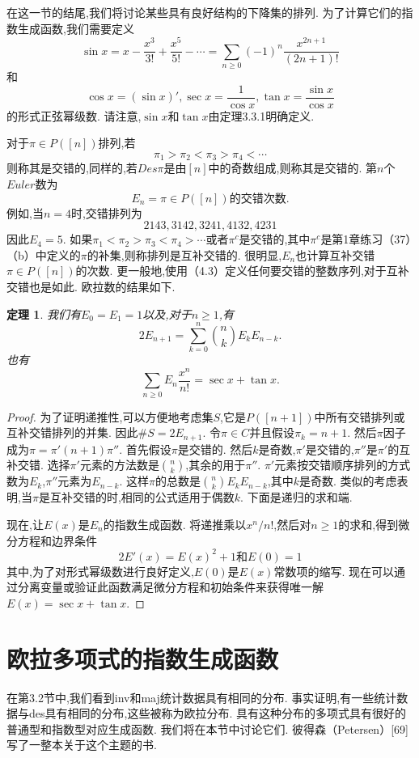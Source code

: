 \documentclass[a4paper,12pt]{ctexbook}
\newtheorem{theorem}[lemma]{\hspace{2em}定理}%
\begin{document}
在这一节的结尾,我们将讨论某些具有良好结构的下降集的排列.  为了计算它们的指数生成函数,我们需要定义
$$
\sin x=x-\frac{x^3}{3!}+\frac{x^5}{5!}-\cdots =\sum_{n\ge0}(-1)^n\frac{x^{2n+1}}{(2n+1)!}
$$
和$$\cos x=(\sin x)',\sec x=\frac{1}{\cos x},\tan x=\frac{\sin x}{\cos x}$$
的{\kaishu 形式正弦幂级数}.  请注意,$\sin x$和$\tan x$由定理3.3.1明确定义.  

对于$\pi\in P([n])$排列,若
\begin{equation}
\pi_{1}>\pi_{2}<\pi_{3}>\pi_{4}<\cdots
\end{equation}
则称其是{\kaishu 交错的},同样的,若$Des\pi$是由$[n]$中的奇数组成,则称其是交错的. 第$n$个$Euler$数为$$E_{n}=\pi\in P([n])\text{的交错次数}. $$例如,当$n=4$时,交错排列为
$$2143,3142,3241,4132,4231$$
因此$E_4=5$. 如果$\pi_{1}<\pi_{2}>\pi_{3}<\pi_{4}>\cdots$或者$\pi^c$是交错的,其中$\pi^c$是第1章练习（37）（b）中定义的$\pi$的补集,则称排列是{\kaishu 互补交错}的.  很明显,$E_n$也计算互补交错$\pi\in P([n])$的次数.  更一般地,使用（4.3）定义任何要交错的整数序列,对于互补交错也是如此.  欧拉数的结果如下.  
\begin{theorem}
	我们有$E_{0}=E_{1}=1$以及,对于$n\ge1$,有
	$$2E_{n+1}=\sum_{k=0}^n\binom{n}{k}E_{k}E_{n-k}. $$
	也有
	$$\sum_{n\ge0}E_{n}\frac{x^{n}}{n!}=\sec x+\tan x. $$
\end{theorem}
\begin{proof}
	为了证明递推性,可以方便地考虑集$S$,它是$ P([n+1])$中所有交错排列或互补交错排列的并集.  因此$\#S=2E_{n+1}$. 令$\pi\in C$并且假设$\pi _k=n+1$. 然后$\pi$因子成为$\pi=\pi'(n+1)\pi''$. 首先假设$\pi$是交错的.  然后$k$是奇数,$\pi'$是交错的,$\pi''$是$\pi'$的互补交错.  选择$\pi'$元素的方法数是$\binom{n}{k}$,其余的用于$\pi''$.  $\pi'$元素按交错顺序排列的方式数为$E_{k}$,$\pi''$元素为$E_{n-k}$. 这样$\pi$的总数是$\binom{n}{k}E_{k}E_{n-k}$,其中$k$是奇数.  类似的考虑表明,当$\pi$是互补交错的时,相同的公式适用于偶数$k$.  下面是递归的求和端.  
	
	现在,让$E(x)$是$E_{n}$的指数生成函数.  将递推乘以${x^{n}}/{n!}$,然后对$n\ge 1$的求和,得到微分方程和边界条件$$2E'(x)=E(x)^2+1 \text{和}E(0)=1$$其中,为了对形式幂级数进行良好定义,$E(0)$是$E(x)$常数项的缩写.  现在可以通过分离变量或验证此函数满足微分方程和初始条件来获得唯一解$E(x)=\sec x+\tan x$.  
\end{proof}
\section{欧拉多项式的指数生成函数}
在第3.2节中,我们看到inv和maj统计数据具有相同的分布.  事实证明,有一些统计数据与des具有相同的分布,这些被称为欧拉分布.  具有这种分布的多项式具有很好的普通型和指数型对应生成函数.  我们将在本节中讨论它们.  彼得森（Petersen）[69]写了一整本关于这个主题的书.  
\end{document}
